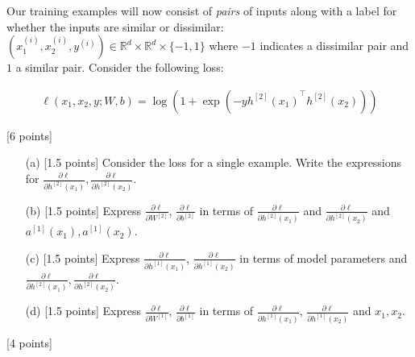 \documentclass{article}
\newif\ifsolutions
\newenvironment{labelledanswer}{{\bf Answer:} \sf }{}%
\newcommand{\answer}[2]
{{
\ifsolutions
\begin{labelledanswer}
\color{red} 
#2
\end{labelledanswer}
\else
#1
\fi
}}
\begin{document}
Our training examples will now consist of \textit{pairs} of inputs along with a label for whether the inputs are similar or dissimilar: $(x^{(i)}_1, x^{(i)}_2, y^{(i)}) \in \mathbb{R}^{d} \times \mathbb{R}^d \times \{-1, 1\}$ where $-1$ indicates a dissimilar pair and $1$ a similar pair. Consider the following loss:

\begin{align}
    \ell(x_1, x_2, y; W, b) = \log\left(1 + \exp(-y{h^{[2]}(x_1)}^\top h^{[2]}(x_2))\right)
\end{align}

\noindent {} [6 points]

\begin{itemize}
    \item [(a)] [1.5 points] Consider the loss for a single example. Write the expressions for $\frac{\partial \ell}{\partial h^{[2]}(x_1)},  \frac{\partial \ell}{\partial h^{[2]}(x_2)}$. 
    
    \answer{}{}
    
    \item [(b)] [1.5 points] Express $\frac{\partial \ell}{\partial W^{[2]}}$, $\frac{\partial \ell}{\partial b^{[2]}}$ in terms of $\frac{\partial \ell}{\partial h^{[2]}(x_1)}$ and $\frac{\partial \ell}{\partial h^{[2]}(x_2)}$ and $a^{[1]}(x_1), a^{[1]}(x_2)$.
    
    \answer{}{}
    
    \item [(c)] [1.5 points] Express $\frac{\partial \ell}{\partial h^{[1]}(x_1)}$, $\frac{\partial \ell}{\partial h^{[1]}(x_2)}$ in terms of model parameters and $\frac{\partial \ell}{\partial h^{[2]}(x_1)}, \frac{\partial \ell}{\partial h^{[2]}(x_2)}$.
    
    \answer{}{}
    
    \item [(d)] [1.5 points] Express $\frac{\partial \ell}{\partial W^{[1]}}$, $\frac{\partial \ell}{\partial b^{[1]}}$ in terms of $\frac{\partial \ell}{\partial h^{[1]}(x_1)}$, $\frac{\partial \ell}{\partial h^{[1]}(x_2)}$ and $x_1, x_2$.
    
    \answer{}{}
    
\end{itemize}

\noindent {} [4 points]
\end{document}
